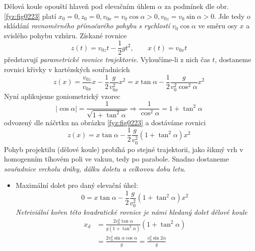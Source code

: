 \begin{example}
  Dělová koule opouští hlaveň pod elevačním úhlem $\alpha$ za podmínek dle obr. 
  \ref{fyz:fig0223} platí $x_0=0, z_0=0, v_{0x}=v_0\cos\alpha>0, v_{0z}=v_0\sin\alpha>0$. Jde 
  tedy o skládání \emph{rovnoměrného přímočarého pohybu s rychlostí} $v_0\cos\alpha$ ve směru osy 
  \(x\) a svislého pohybu vzhůru. Získané rovnice
  \begin{equation}\label{mech:eq_delo_rce_pohybu}
    z(t)=v_{0z}t-\frac{1}{2}gt^2, \qquad x(t)=v_{0x}t
  \end{equation}
  představují \emph{parametrické rovnice trajektorie}. Vyloučíme-li z nich čas $t$, dostaneme 
  rovnici křivky v kartézských souřadnicích
  \begin{equation}\label{mech:eq_delo_vakuum_param_rce}
    z(x)=  \frac{v_{0z}}{v_{0x}}x-\frac{1}{2}\frac{g}{v_{0x}^2}x^2
        = x\tan\alpha-\frac{1}{2}\frac{g}{v_0^2\cos^2\alpha}x^2
  \end{equation}
  Nyní aplikujeme goniometrický vzorec
  \begin{equation*}
    \vert\cos\alpha\rvert = \frac{1}{\sqrt{1+\tan^2\alpha}}\Rightarrow \frac{1}{\cos^2\alpha} 
                          = 1+\tan^2\alpha
  \end{equation*}
  odvozený dle náčrtku na obrázku \ref{fyz:fig0223} a dostáváme rovnici
  \begin{equation}\label{mech_eq_example_vysledna_rce}
    z(x)=x\tan\alpha-\frac{1}{2}\frac{g}{v_0^2}(1+\tan^2\alpha)x^2
  \end{equation}
  Pohyb projektilu (dělové koule) probíhá po stejné trajektorii, jako šikmý vrh v homogenním 
  tíhovém poli ve vakuu, tedy po parabole. Snadno dostaneme \emph{souřadnice vrcholu dráhy, dálku 
  doletu a celkovou dobu letu}.

  \begin{itemize}
    \item Maximální dolet pro daný elevační úhel:
      \begin{equation}\label{mech:eq_elevacni_uhel_1}
        0=x\tan\alpha-\frac{1}{2}\frac{g}{v_0^2}(1+\tan^2\alpha)x^2
      \end{equation}
      \emph{Netriviální kořen této kvadratické rovnice je námi hledaný dolet dělové koule}
      \begin{align}  %
        x_d &=\frac{2v_0^2\tan\alpha}{g(1+\tan^2\alpha)}(1+\tan^2\alpha)        \nonumber \\
            &=\frac{2v_0^2\sin\alpha\cos\alpha}{g}=\frac{v_0^2\sin{2\alpha}}{g} \label{fyz:eq235}
      \end{align}


\end{itemize}
\end{example}
